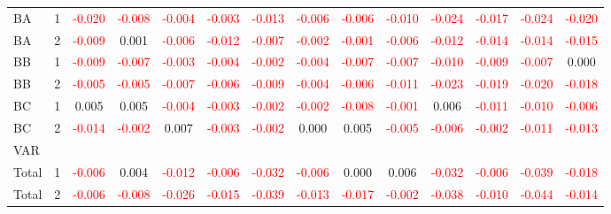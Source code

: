 \begin{table}[H]
{\begin{tabular}{llcccccccccccc}
BA & 1 & \textcolor{red}{-0.020} & \textcolor{red}{-0.008} & \textcolor{red}{-0.004} & \textcolor{red}{-0.003} & \textcolor{red}{-0.013} & \textcolor{red}{-0.006} & \textcolor{red}{-0.006} & \textcolor{red}{-0.010} & \textcolor{red}{-0.024} & \textcolor{red}{-0.017} & \textcolor{red}{-0.024} & \textcolor{red}{-0.020}\\
BA & 2 & \textcolor{red}{-0.009} & 0.001 & \textcolor{red}{-0.006} & \textcolor{red}{-0.012} & \textcolor{red}{-0.007} & \textcolor{red}{-0.002} & \textcolor{red}{-0.001} & \textcolor{red}{-0.006} & \textcolor{red}{-0.012} & \textcolor{red}{-0.014} & \textcolor{red}{-0.014} & \textcolor{red}{-0.015}\\
BB & 1 & \textcolor{red}{-0.009} & \textcolor{red}{-0.007} & \textcolor{red}{-0.003} & \textcolor{red}{-0.004} & \textcolor{red}{-0.002} & \textcolor{red}{-0.004} & \textcolor{red}{-0.007} & \textcolor{red}{-0.007} & \textcolor{red}{-0.010} & \textcolor{red}{-0.009} & \textcolor{red}{-0.007} & 0.000\\
BB & 2 & \textcolor{red}{-0.005} & \textcolor{red}{-0.005} & \textcolor{red}{-0.007} & \textcolor{red}{-0.006} & \textcolor{red}{-0.009} & \textcolor{red}{-0.004} & \textcolor{red}{-0.006} & \textcolor{red}{-0.011} & \textcolor{red}{-0.023} & \textcolor{red}{-0.019} & \textcolor{red}{-0.020} & \textcolor{red}{-0.018}\\
BC & 1 & 0.005 & 0.005 & \textcolor{red}{-0.004} & \textcolor{red}{-0.003} & \textcolor{red}{-0.002} & \textcolor{red}{-0.002} & \textcolor{red}{-0.008} & \textcolor{red}{-0.001} & 0.006 & \textcolor{red}{-0.011} & \textcolor{red}{-0.010} & \textcolor{red}{-0.006}\\
BC & 2 & \textcolor{red}{-0.014} & \textcolor{red}{-0.002} & 0.007 & \textcolor{red}{-0.003} & \textcolor{red}{-0.002} & 0.000 & 0.005 & \textcolor{red}{-0.005} & \textcolor{red}{-0.006} & \textcolor{red}{-0.002} & \textcolor{red}{-0.011} & \textcolor{red}{-0.013}\\
\hline
VAR &  &  &  &  &  &  &  &  &  &  &  &  & \\
\hline
Total & 1 & \textcolor{red}{-0.006} & 0.004 & \textcolor{red}{-0.012} & \textcolor{red}{-0.006} & \textcolor{red}{-0.032} & \textcolor{red}{-0.006} & 0.000 & 0.006 & \textcolor{red}{-0.032} & \textcolor{red}{-0.006} & \textcolor{red}{-0.039} & \textcolor{red}{-0.018}\\
Total & 2 & \textcolor{red}{-0.006} & \textcolor{red}{-0.008} & \textcolor{red}{-0.026} & \textcolor{red}{-0.015} & \textcolor{red}{-0.039} & \textcolor{red}{-0.013} & \textcolor{red}{-0.017} & \textcolor{red}{-0.002} & \textcolor{red}{-0.038} & \textcolor{red}{-0.010} & \textcolor{red}{-0.044} & \textcolor{red}{-0.014}\\

\end{tabular}}
\end{table}
